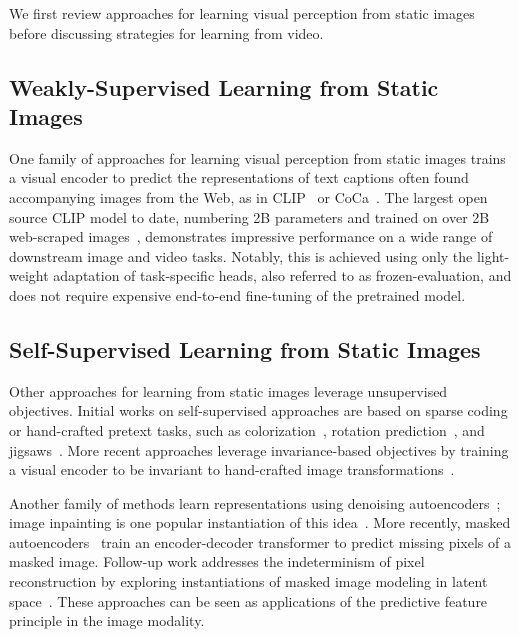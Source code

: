 \documentclass[twocolumn]{fairmeta}
\theoremstyle{plain}
\theoremstyle{definition}
\theoremstyle{remark}
\begin{document}
We first review approaches for learning visual perception from static images before discussing strategies for learning from video.

\subsection*{Weakly-Supervised Learning from Static Images}
One family of approaches for learning visual perception from static images trains a visual encoder to predict the representations of text captions often found accompanying images from the Web, as in CLIP~\citep{radford2021learning} or CoCa~\citep{yu2022coca}.
The largest open source CLIP model to date, numbering 2B parameters and trained on over 2B web-scraped images~\citep{cherti2023reproducible}, demonstrates impressive performance on a wide range of downstream image and video tasks.
Notably, this is achieved using only the light-weight adaptation of task-specific heads, also referred to as frozen-evaluation, and does not require expensive end-to-end fine-tuning of the pretrained model.

\subsection*{Self-Supervised Learning from Static Images}
Other approaches for learning from static images leverage unsupervised objectives.
Initial works on self-supervised approaches are based on sparse coding or hand-crafted pretext tasks, such as colorization~\citep{larsson2016learning,larsson2017colorization}, rotation prediction~\citep{gidaris2020learning}, and jigsaws~\citep{noroozi2016unsupervised}.
More recent approaches leverage invariance-based objectives by training a visual encoder to be invariant to hand-crafted image transformations~\citep{wu2018unsupervised,chen2020simple}.

Another family of methods learn representations using denoising autoencoders~\citep{denoising_vincent}; image inpainting is one popular instantiation of this idea~\citep{pathak2016context}.
More recently, masked autoencoders~\citep{he2021masked} train an encoder-decoder transformer to predict missing pixels of a masked image.
Follow-up work addresses the indeterminism of pixel reconstruction by exploring instantiations of masked image modeling in latent space~\citep{baevski2022data2vec,assran2023self,baevski2022efficient}.
These approaches can be seen as applications of the predictive feature principle in the image modality.
\end{document}
